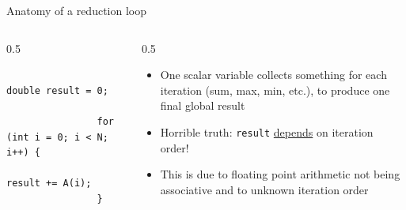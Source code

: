 \documentclass[
    aspectratio=169,
    \createHandout
]{beamer}
\begin{document}
\begin{frame}[fragile]{Anatomy of a reduction loop}
    \begin{columns}
        \begin{column}{0.5\linewidth}
            \begin{verbatim}
                double result = 0;

                for (int i = 0; i < N; i++) {
                    result += A(i);
                }
            \end{verbatim}
        \end{column}
        \begin{column}{0.5\linewidth}
            \begin{itemize}
                \item One scalar variable collects something for each iteration (sum, max, min, etc.), to produce one final global result
                \pause
                \item Horrible truth: \texttt{result} \href{https://godbolt.org/z/8z45oxd4W}{depends} on iteration order!
                \item This is due to floating point arithmetic not being associative and to unknown iteration order
            \end{itemize}
        \end{column}
    \end{columns}
\end{frame}

\end{document}
